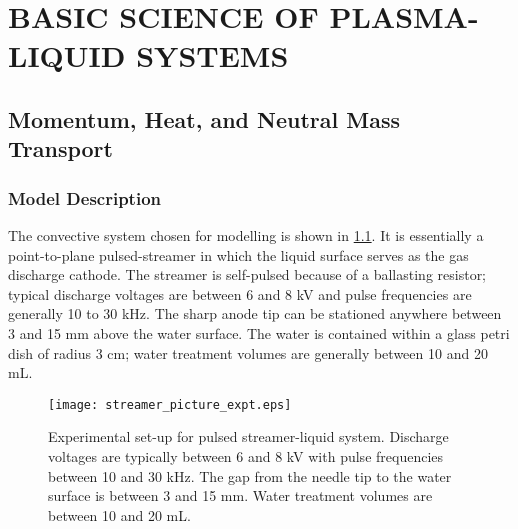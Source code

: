 \chapter{BASIC SCIENCE OF PLASMA-LIQUID SYSTEMS}
\label{chap-two}

\section{Momentum, Heat, and Neutral Mass Transport}
\label{sec:plasfree_model}
\subsection{Model Description}

The convective system chosen for modelling is shown in \cref{fig:streamer_picture}. It is essentially a point-to-plane pulsed-streamer in which the liquid surface serves as the gas discharge cathode. The streamer is self-pulsed because of a ballasting resistor; typical discharge voltages are between 6 and 8 kV and pulse frequencies are generally 10 to 30 kHz. The sharp anode tip can be stationed anywhere between 3 and 15 mm above the water surface. The water is contained within a glass petri dish of radius 3 cm; water treatment volumes are generally between 10 and 20 mL.

\begin{figure}[htpb]
    \centering
        \texttt{[image: streamer\_picture\_expt.eps]}
    \caption{Experimental set-up for pulsed streamer-liquid system. Discharge voltages are typically between 6 and 8 kV with pulse frequencies between 10 and 30 kHz. The gap from the needle tip to the water surface is between 3 and 15 mm. Water treatment volumes are between 10 and 20 mL.}
    \label{fig:streamer_picture}
\end{figure}


